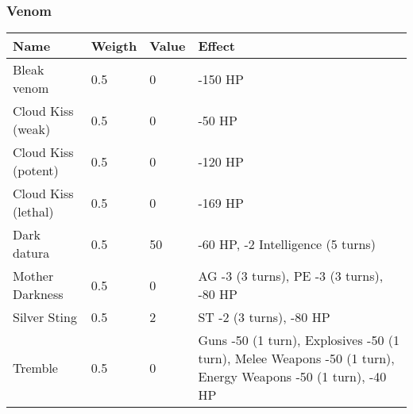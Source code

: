 
\subsubsection{Venom}
\begin{longtable}{|p{4cm}|p{1.2cm}|p{1.2cm}|p{8.5cm}|}
\hline
\bfseries Name & \bfseries Weigth & \bfseries Value & \bfseries Effect\\
\hline
\endhead
Bleak venom & 0.5 & 0 & -150 HP \\
Cloud Kiss (weak) & 0.5 & 0 & -50 HP \\
Cloud Kiss (potent) & 0.5 & 0 & -120 HP \\
Cloud Kiss (lethal) & 0.5 & 0 & -169 HP \\
Dark datura & 0.5 & 50 & -60 HP, -2 Intelligence (5 turns) \\
Mother Darkness & 0.5 & 0 & AG -3 (3 turns), PE -3 (3 turns), -80 HP \\
Silver Sting & 0.5 & 2 & ST -2 (3 turns), -80 HP \\
Tremble & 0.5 & 0 & Guns -50 (1 turn), Explosives -50 (1 turn), Melee Weapons -50 (1 turn), Energy Weapons -50 (1 turn), -40 HP \\
\hline
\end{longtable}
